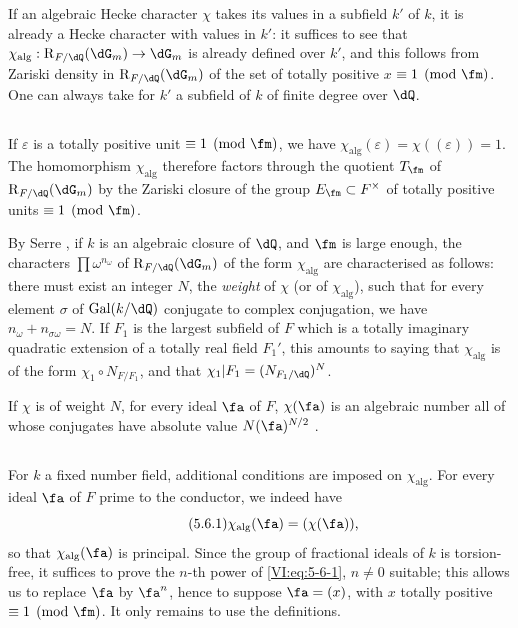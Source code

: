If an algebraic Hecke character $\chi$ takes its values in a
subfield $k'$ of $k$, it is already a Hecke character with values in
$k'$: it suffices to see that $\chi_\text{alg}:\res_{F/\dQ}(\dG_m) \to \dG_m$
is already defined over $k'$, and this follows from Zariski density
in $\res_{F/\dQ}(\dG_m)$ of the set of totally positive $x$
$\equiv 1\pmod\fm$. One can always take for $k'$ a subfield of $k$ of
finite degree over $\dQ$. 





\subsection{}\label{VI:5-5}

If $\varepsilon$ is a totally positive unit $\equiv 1\pmod\fm$, we have
$\chi_\text{alg}(\varepsilon) = \chi((\varepsilon)) = 1$. The homomorphism
$\chi_\text{alg}$ therefore factors through the quotient $T_\fm$ of
$\res_{F/\dQ}(\dG_m)$ by the Zariski closure of the group
$E_\fm\subset F^\times$ of totally positive units $\equiv 1\pmod\fm$.

By Serre \cite[II.3]{se68}, if $k$ is an algebraic closure of
$\dQ$, and $\fm$ is large enough, the characters $\prod \omega^{n_\omega}$
of $\res_{F/\dQ}(\dG_m)$ of the form $\chi_\text{alg}$ are characterised
as follows: there must exist an integer $N$, the \emph{weight} of $\chi$ (or of
$\chi_\text{alg}$), such that for every element $\sigma$ of $\gal(k/\dQ)$
conjugate to complex conjugation, we have $n_\omega+n_{\sigma \omega}=N$. If
$F_1$ is the largest subfield of $F$ which is a totally imaginary quadratic
extension of a totally real field $F_1'$, this amounts to
saying that $\chi_\text{alg}$ is of the form $\chi_1\circ N_{F/F_1}$, and that
$\chi_1|F_1=(N_{F_1/\dQ})^N$.

If $\chi$ is of weight $N$, for every ideal $\fa$ of $F$, $\chi(\fa)$ is an
algebraic number all of whose conjugates have absolute value
$N(\fa)^{N/2}$ \cite[II.3 prop.2]{se68}. 





\subsection{}\label{VI:5-6}

For $k$ a fixed number field, additional conditions are
imposed on $\chi_\text{alg}$. For every ideal $\fa$ of $F$ prime to the
conductor, we indeed have 
\begin{equation*}\tag{5.6.1}\label{VI:eq:5-6-1}
  \chi_\text{alg}(\fa) = (\chi(\fa)) \text{,} 
\end{equation*}
so that $\chi_\text{alg}(\fa)$ is principal. Since the group of
fractional ideals of $k$ is torsion-free, it suffices to prove the
$n$-th power of \eqref{VI:eq:5-6-1}, $n\ne 0$ suitable; this allows us
to replace $\fa$ by $\fa^n$, hence to suppose $\fa=(x)$, with $x$ totally
positive $\equiv 1\pmod\fm$. It only remains to use the definitions.

